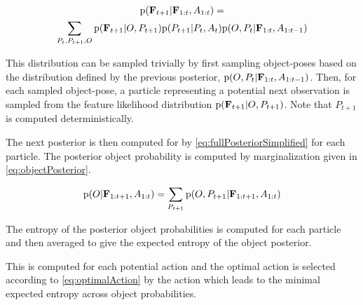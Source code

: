                 {\small
                \begin{multline}
                    \label{eq:evidenceDistribution}
                    \prob{\set{F}_{t+1}|\set{F}_{1:t}, A_{1:t}} = \\ \sum_{P_t,P_{t+1},O}  \prob{\set{F}_{t+1}|O,P_{t+1}} \prob{P_{t+1}|P_t,A_t} \prob{O,P_t|\set{F}_{1:t},A_{1:t-1}}
                \end{multline}
                }

%

                This distribution can be sampled trivially by first sampling object-poses based on the distribution defined by the previous posterior, $\text{p}(O,P_t|\mathbf{F}_{1:t},A_{1:t-1})$. Then, for each sampled object-pose, a particle representing a potential next observation is sampled from the feature likelihood distribution $\text{p}(\mathbf{F}_{t+1}|O,P_{t+1})$. Note that $P_{t+1}$ is computed deterministically.

                The next posterior is then computed for by \eqref{eq:fullPosteriorSimplified} for each particle. The posterior object probability is computed by marginalization given in \eqref{eq:objectPosterior}.

                \begin{equation}
                    \label{eq:objectPosterior}
                    \prob{O|\set{F}_{1:t+1},A_{1:t}} = \sum_{P_{t+1}} \prob{O,P_{t+1}|\set{F}_{1:t+1},A_{1:t}}
                \end{equation}

                The entropy of the posterior object probabilities is computed for each particle and then averaged to give the expected entropy of the object posterior. 

                This is computed for each potential action and the optimal action is selected according to \eqref{eq:optimalAction} by the action which leads to the minimal expected entropy across object probabilities.
